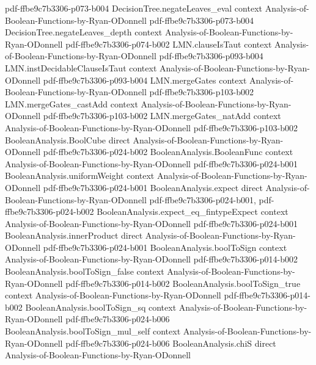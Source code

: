 \begin{theorem}
  {pdf-ffbe9c7b3306-p073-b004}
\proofstep
  {DecisionTree.negateLeaves_eval}
  {context}
  {Analysis-of-Boolean-Functions-by-Ryan-ODonnell}
  {pdf-ffbe9c7b3306-p073-b004}
\proofstep
  {DecisionTree.negateLeaves_depth}
  {context}
  {Analysis-of-Boolean-Functions-by-Ryan-ODonnell}
  {pdf-ffbe9c7b3306-p074-b002}
\proofstep
  {LMN.clauseIsTaut}
  {context}
  {Analysis-of-Boolean-Functions-by-Ryan-ODonnell}
  {pdf-ffbe9c7b3306-p093-b004}
\proofstep
  {LMN.instDecidableClauseIsTaut}
  {context}
  {Analysis-of-Boolean-Functions-by-Ryan-ODonnell}
  {pdf-ffbe9c7b3306-p093-b004}
\proofstep
  {LMN.mergeGates}
  {context}
  {Analysis-of-Boolean-Functions-by-Ryan-ODonnell}
  {pdf-ffbe9c7b3306-p103-b002}
\proofstep
  {LMN.mergeGates_castAdd}
  {context}
  {Analysis-of-Boolean-Functions-by-Ryan-ODonnell}
  {pdf-ffbe9c7b3306-p103-b002}
\proofstep
  {LMN.mergeGates_natAdd}
  {context}
  {Analysis-of-Boolean-Functions-by-Ryan-ODonnell}
  {pdf-ffbe9c7b3306-p103-b002}
\proofstep
  {BooleanAnalysis.BoolCube}
  {direct}
  {Analysis-of-Boolean-Functions-by-Ryan-ODonnell}
  {pdf-ffbe9c7b3306-p024-b002}
\proofstep
  {BooleanAnalysis.BooleanFunc}
  {context}
  {Analysis-of-Boolean-Functions-by-Ryan-ODonnell}
  {pdf-ffbe9c7b3306-p024-b001}
\proofstep
  {BooleanAnalysis.uniformWeight}
  {context}
  {Analysis-of-Boolean-Functions-by-Ryan-ODonnell}
  {pdf-ffbe9c7b3306-p024-b001}
\proofstep
  {BooleanAnalysis.expect}
  {direct}
  {Analysis-of-Boolean-Functions-by-Ryan-ODonnell}
  {pdf-ffbe9c7b3306-p024-b001,
    pdf-ffbe9c7b3306-p024-b002}
\proofstep
  {BooleanAnalysis.expect_eq_fintypeExpect}
  {context}
  {Analysis-of-Boolean-Functions-by-Ryan-ODonnell}
  {pdf-ffbe9c7b3306-p024-b001}
\proofstep
  {BooleanAnalysis.innerProduct}
  {direct}
  {Analysis-of-Boolean-Functions-by-Ryan-ODonnell}
  {pdf-ffbe9c7b3306-p024-b001}
\proofstep
  {BooleanAnalysis.boolToSign}
  {context}
  {Analysis-of-Boolean-Functions-by-Ryan-ODonnell}
  {pdf-ffbe9c7b3306-p014-b002}
\proofstep
  {BooleanAnalysis.boolToSign_false}
  {context}
  {Analysis-of-Boolean-Functions-by-Ryan-ODonnell}
  {pdf-ffbe9c7b3306-p014-b002}
\proofstep
  {BooleanAnalysis.boolToSign_true}
  {context}
  {Analysis-of-Boolean-Functions-by-Ryan-ODonnell}
  {pdf-ffbe9c7b3306-p014-b002}
\proofstep
  {BooleanAnalysis.boolToSign_sq}
  {context}
  {Analysis-of-Boolean-Functions-by-Ryan-ODonnell}
  {pdf-ffbe9c7b3306-p024-b006}
\proofstep
  {BooleanAnalysis.boolToSign_mul_self}
  {context}
  {Analysis-of-Boolean-Functions-by-Ryan-ODonnell}
  {pdf-ffbe9c7b3306-p024-b006}
\proofstep
  {BooleanAnalysis.chiS}
  {direct}
  {Analysis-of-Boolean-Functions-by-Ryan-ODonnell}

\end{theorem}
